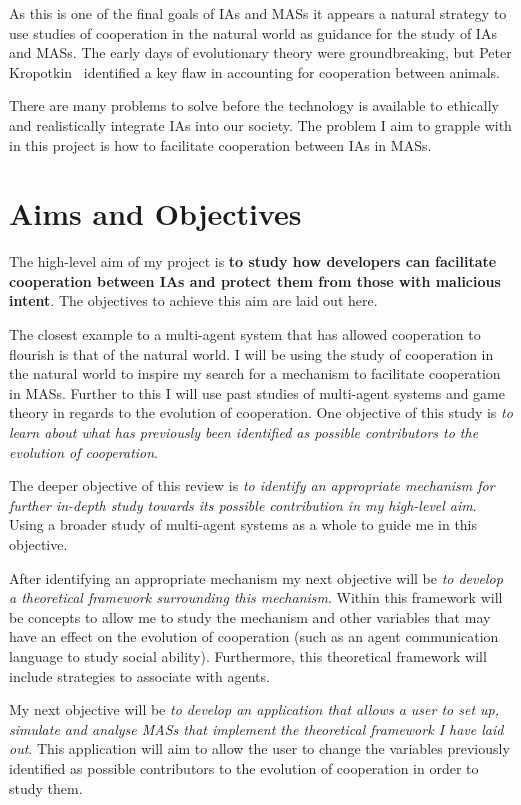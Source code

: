 \documentclass[]{final_report}
\begin{document}
As this is one of the final goals of IAs and MASs it appears a natural strategy to use studies of cooperation in the natural world as guidance for the study of IAs and MASs. The early days of evolutionary theory were groundbreaking, but Peter Kropotkin~\cite{kropotkin1902mutual} identified a key flaw in accounting for cooperation between animals.\par
There are many problems to solve before the technology is available to ethically and realistically integrate IAs into our society. The problem I aim to grapple with in this project is how to facilitate cooperation between IAs in MASs.

\section{Aims and Objectives}
\label{sec:aao}
The high-level aim of my project is \textbf{to study how developers can facilitate cooperation between IAs and protect them from those with malicious intent}. The objectives to achieve this aim are laid out here.\par
The closest example to a multi-agent system that has allowed cooperation to flourish is that of the natural world. I will be using the study of cooperation in the natural world to inspire my search for a mechanism to facilitate cooperation in MASs. Further to this I will use past studies of multi-agent systems and game theory in regards to the evolution of cooperation. One objective of this study is \textit{to learn about what has previously been identified as possible contributors to the evolution of cooperation}.\par
The deeper objective of this review is \textit{to identify an appropriate mechanism for further in-depth study towards its possible contribution in my high-level aim}. Using a broader study of multi-agent systems as a whole to guide me in this objective.\par
After identifying an appropriate mechanism my next objective will be \textit{to develop a theoretical framework surrounding this mechanism}. Within this framework will be concepts to allow me to study the mechanism and other variables that may have an effect on the evolution of cooperation (such as an agent communication language to study social ability). Furthermore, this theoretical framework will include strategies to associate with agents.\par
My next objective will be \textit{to develop an application that allows a user to set up, simulate and analyse MASs that implement the theoretical framework I have laid out}. This application will aim to allow the user to change the variables previously identified as possible contributors to the evolution of cooperation in order to study them.\par
\end{document}
